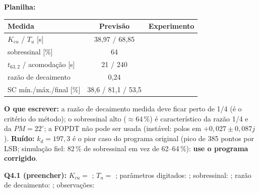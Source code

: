 \documentclass[11pt,a4paper]{article}
\begin{document}
\textbf{Planilha:}
\begin{center}\small\begin{tabular}{lcc}\toprule Medida & Previsão & Experimento\\\midrule $K_{cu}$ / $T_u$ [s] & 38,97 / 68,85 & \underline{\hspace{1.5cm}}\\ sobressinal [\%] & 64 & \underline{\hspace{1.5cm}}\\ $t_{63,2}$ / acomodação [s] & 21 / 240 & \underline{\hspace{1.5cm}}\\ razão de decaimento & 0,24 & \underline{\hspace{1.5cm}}\\ SC mín./máx./final [\%] & 38,6 / 81,1 / 53,5 & \underline{\hspace{1.5cm}}\\\bottomrule\end{tabular}\end{center}
\textbf{O que escrever:} a razão de decaimento medida deve ficar perto de 1/4 (é o critério do método); o sobressinal alto ($\approx64\,\%$) é característico da razão 1/4 e da $PM=22^\circ$; a FOPDT não pode ser usada (instável: polos em $+0{,}027\pm0{,}087j$). \textbf{Ruído:} $k_d=197{,}3$ é o pior caso do programa original (pico de 385 pontos por LSB; simulação fiel: 82\,\% de sobressinal em vez de 62--64\,\%): \textbf{use o programa corrigido}.
\begin{real}\textbf{Q4.1 (preencher):} $K_{cu}=$ \underline{\hspace{1.5cm}}; $T_u=$ \underline{\hspace{1.5cm}}; parâmetros digitados: \underline{\hspace{4cm}}; sobressinal: \underline{\hspace{1.5cm}}; razão de decaimento: \underline{\hspace{1.5cm}}; observações: \underline{\hspace{4cm}}\end{real}
\end{document}
